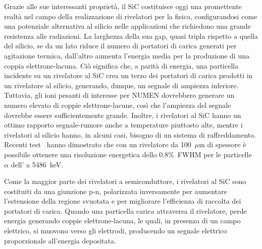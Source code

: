 Grazie alle sue interessanti proprietà, il SiC costituisce oggi una promettente realtà nel campo della realizzazione di rivelatori per la fisica, configurandosi come una potenziale alternativa al silicio nelle applicazioni che richiedono una grande resistenza alle radiazioni.
La larghezza della sua gap, quasi tripla rispetto a quella del silicio, se da un lato riduce il numero di portatori di carica generati per agitazione termica, dall'altro aumenta l'energia media per la produzione di una coppia elettrone-lacuna. 
Ciò significa che, a parità di energia, una particella incidente su un rivelatore al SiC crea un terzo dei portatori di carica prodotti in un rivelatore al silicio, generando, dunque, un segnale di ampiezza inferiore.
Tuttavia, gli ioni pesanti di interesse per NUMEN dovrebbero generare un numero elevato di coppie elettrone-lacune, così che l'ampiezza del segnale dovrebbe essere sufficientemente grande.
Inoltre, i rivelatori al SiC hanno un ottimo rapporto segnale-rumore anche a temperature piuttosto alte, mentre i rivelatori al silicio hanno, in alcuni casi, bisogno di un sistema di raffreddamento.
Recenti test~\cite{tudisco:sensors18} hanno dimostrato che con un rivelatore da 100~$\mu$m di spessore è possibile ottenere una risoluzione energetica dello 0.8\%~FWHM per le particelle $\alpha$ dell' a 5486~keV.


Come la maggior parte dei rivelatori a semiconduttore, i rivelatori al SiC sono costituiti da una giunzione p-n, polarizzata inversamente per aumentare l'estensione della regione svuotata e per migliorare l'efficienza di raccolta dei portatori di carica.
Quando una particella carica attraversa il rivelatore, perde energia generando coppie elettrone-lacuna, le quali, in presenza di un campo elettrico, si muovono verso gli elettrodi, producendo un segnale elettrico proporzionale all'energia depositata.

